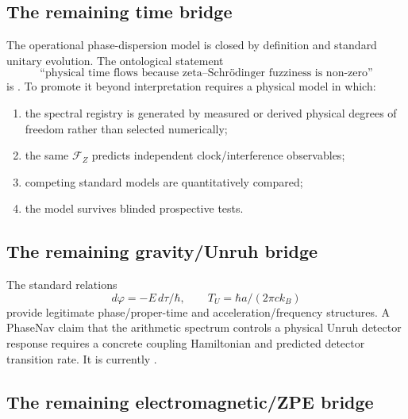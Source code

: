 \subsection{The remaining time bridge}

The operational phase-dispersion model is closed by definition and standard unitary evolution. The ontological statement
\begin{equation}
\text{``physical time flows because zeta--Schrödinger fuzziness is non-zero''}
\end{equation}
is . To promote it beyond interpretation requires a physical model in which:
\begin{enumerate}[leftmargin=2em]
\item the spectral registry is generated by measured or derived physical degrees of freedom rather than selected numerically;
\item the same \(\mathcal F_Z\) predicts independent clock/interference observables;
\item competing standard models are quantitatively compared;
\item the model survives blinded prospective tests.
\end{enumerate}

\subsection{The remaining gravity/Unruh bridge}

The standard relations
\begin{equation}
d\varphi=-E\,d\tau/\hbar,
\qquad
T_U=\hbar a/(2\pi c k_B)
\end{equation}
provide legitimate phase/proper-time and acceleration/frequency structures. A PhaseNav claim that the arithmetic spectrum controls a physical Unruh detector response requires a concrete coupling Hamiltonian and predicted detector transition rate. It is currently .

\subsection{The remaining electromagnetic/ZPE bridge}

